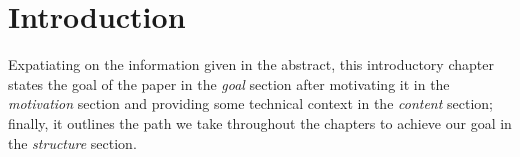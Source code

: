 \chapter{Introduction}
Expatiating on the information given in the abstract,
this introductory chapter
states the goal of the paper in the \textit{goal} section
after motivating it in the \textit{motivation} section
and providing some technical context in the \textit{content} section;
finally, it outlines the path we take throughout the chapters
to achieve our goal in the \textit{structure} section.








